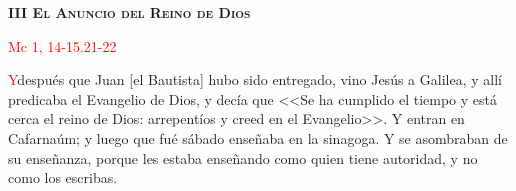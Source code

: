 \begin{center}
    \textbf{\textsc{III El Anuncio del Reino de Dios}}

    \textcolor{red}{Mc 1, 14-15.21-22}
\end{center}

\lettrine[lines=2]{\textcolor{red}{Y}}\space después que Juan [el Bautista] hubo sido entregado, vino Jesús a Galilea, y allí predicaba el Evangelio de Dios, y decía que <<Se ha cumplido
el tiempo y está cerca el reino de Dios: arrepentíos y creed en el Evangelio>>. Y entran en Cafarnaúm; y luego que fué sábado enseñaba en la sinagoga. Y se asombraban de su
enseñanza, porque les estaba enseñando como quien tiene autoridad, y no como los escribas.